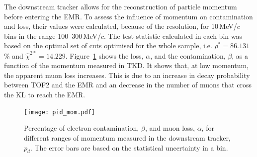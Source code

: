 The downstream tracker allows for the reconstruction of particle momentum before entering the EMR. To assess the influence of momentum on contamination and loss, their values were calculated, because of the resolution, for 10\,MeV/$c$ bins in the range 100--300\,MeV/$c$. 
The test statistic calculated in each bin was based on the optimal set of cuts optimised for the whole sample, i.e. $\rho^*=86.131$\,\% and $\hat{\chi}^{2*}=14.229$. Figure~\ref{fig:emr_pid_mom} shows the loss, $\alpha$, and the contamination, $\beta$, as a function of the momentum measured in TKD. It shows that, at low momentum, the apparent muon loss increases. This is due to an increase in decay probability between TOF2 and the EMR and an decrease in the number of muons that cross the KL to reach the EMR.

\begin{figure}[htb!]
	\begin{center}
		\texttt{[image: pid\_mom.pdf]}  		
		\caption{Percentage of electron contamination, $\beta$, and muon loss, $\alpha$, for different ranges of momentum measured in the downstream tracker, $p_d$. The error bars are based on the statistical uncertainty in a bin.}
		\label{fig:emr_pid_mom}
	\end{center}
\end{figure}

